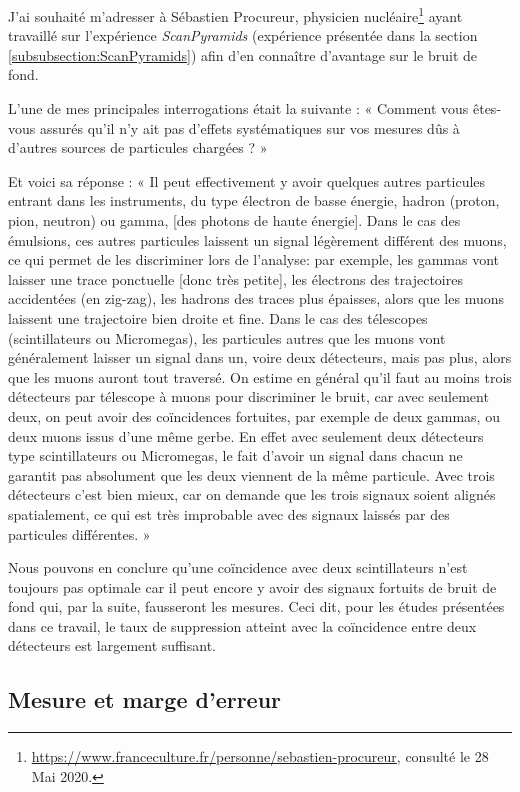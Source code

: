\documentclass[a4paper, 12pt]{article}
\begin{document}
\begin{spacing}{1.5}
J'ai souhaité m'adresser à Sébastien Procureur, physicien nucléaire\footnote{\url{https://www.franceculture.fr/personne/sebastien-procureur}, consulté le 28 Mai 2020.} ayant travaillé sur l'expérience \emph{ScanPyramids} (expérience présentée dans la section \ref{subsubsection:ScanPyramids}) afin d'en connaître d'avantage sur le bruit de fond.

L'une de mes principales interrogations était la suivante : « Comment vous êtes-vous assurés qu’il n’y ait pas d’effets systématiques sur vos mesures dûs à d’autres sources de particules chargées ? »

Et voici sa réponse : « Il peut effectivement y avoir quelques autres particules entrant dans les instruments, du type électron de basse énergie, hadron (proton, pion, neutron) ou gamma, [des photons de haute énergie]. Dans le cas des émulsions, ces autres particules laissent un signal légèrement différent des muons, ce qui permet de les discriminer lors de l'analyse: par exemple, les gammas vont laisser une trace ponctuelle [donc très petite], les électrons des trajectoires accidentées (en zig-zag), les hadrons des traces plus épaisses, alors que les muons laissent une trajectoire bien droite et fine. Dans le cas des télescopes (scintillateurs ou Micromegas), les particules autres que les muons vont généralement laisser un signal dans un, voire deux détecteurs, mais pas plus, alors que les muons auront tout traversé. On estime en général qu'il faut au moins trois détecteurs par télescope à muons pour discriminer le bruit, car avec seulement deux, on peut avoir des coïncidences fortuites, par exemple de deux gammas, ou deux muons issus d'une même gerbe. En effet avec seulement deux détecteurs type scintillateurs ou Micromegas, le fait d'avoir un signal dans chacun ne garantit pas absolument que les deux viennent de la même particule. Avec trois détecteurs c'est bien mieux, car on demande que les trois signaux soient alignés spatialement, ce qui est très improbable avec des signaux laissés par des particules différentes. »

Nous pouvons en conclure qu'une coïncidence avec deux scintillateurs n'est toujours pas optimale car il peut encore y avoir des signaux fortuits de bruit de fond qui, par la suite, fausseront les mesures. Ceci dit, pour les études présentées dans ce travail, le taux de suppression atteint avec la coïncidence entre deux détecteurs est largement suffisant.

\subsection{Mesure et marge d'erreur}
\label{margederreur}


\end{spacing}
\end{document}

